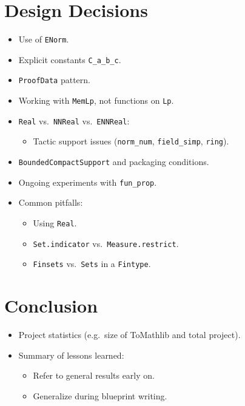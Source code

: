 \documentclass[12pt]{amsart}
\begin{document}
\section{Design Decisions}
\begin{itemize}
  \item Use of \texttt{ENorm}.
  \item Explicit constants \texttt{C\_a\_b\_c}.
  \item \texttt{ProofData} pattern.
  \item Working with \texttt{MemLp}, not functions on \texttt{Lp}.
  \item \texttt{Real} vs.\ \texttt{NNReal} vs.\ \texttt{ENNReal}:
    \begin{itemize}
      \item Tactic support issues (\texttt{norm\_num}, \texttt{field\_simp}, \texttt{ring}).
    \end{itemize}
  \item \texttt{BoundedCompactSupport} and packaging conditions.
  \item Ongoing experiments with \texttt{fun\_prop}.
  \item Common pitfalls:
    \begin{itemize}
      \item Using \texttt{Real}.
      \item \texttt{Set.indicator} vs.\ \texttt{Measure.restrict}.
      \item \texttt{Finsets} vs.\ \texttt{Sets} in a \texttt{Fintype}.
    \end{itemize}
\end{itemize}

\section{Conclusion}
\begin{itemize}
  \item Project statistics (e.g.\ size of ToMathlib and total project).
  \item Summary of lessons learned:
    \begin{itemize}
      \item Refer to general results early on.
      \item Generalize during blueprint writing.
    \end{itemize}
\end{itemize}



\end{document}

